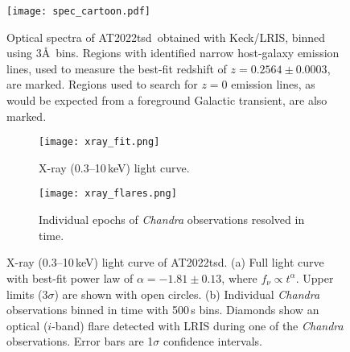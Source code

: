 \documentclass{nature_plusfigure}
\newcommand{\at}{AT2022tsd}
\begin{document}
\begin{extended_data}

\renewcommand{\thefigure}{\arabic{figure}~Extended~Data}
\renewcommand{\thefigure}{Extended Data Figure \arabic{figure}}
\renewcommand{\figurename}{}
\setcounter{figure}{0}

\renewcommand{\thetable}{\arabic{table}~Extended~Data}
\renewcommand{\thetable}{Extended Data Table \arabic{table}}
\renewcommand{\tablename}{}
\setcounter{table}{0}

\begin{figure}[ht]
 \centering
\texttt{[image: spec\_cartoon.pdf]}
  \caption{Optical spectra of \at\ obtained with Keck/LRIS, binned using 3\AA\ bins. Regions with identified narrow host-galaxy emission lines, used to measure the best-fit redshift of $z=0.2564\pm0.0003$, are marked. Regions used to search for $z=0$ emission lines, as would be expected from a foreground Galactic transient, are also marked.}
 \label{fig:spec}
\end{figure}

\begin{figure}[!ht]
 \centering
 \begin{subfigure}[t]{1.0\textwidth}
 	\centering
	\texttt{[image: xray\_fit.png]}
	\caption{X-ray (0.3--10\,keV) light curve.}
 \end{subfigure}
 \begin{subfigure}[t]{1.0\textwidth}
 	\centering
	\texttt{[image: xray\_flares.png]}
	\caption{Individual epochs of {\it Chandra} observations resolved in time.}
 \end{subfigure}
  \caption{X-ray (0.3--10\,keV) light curve of \at. (a) Full light curve with best-fit power law of $\alpha=-1.81\pm0.13$, where $f_\nu \propto t^{\alpha}$. Upper limits (3$\sigma$) are shown with open circles. (b) Individual {\it Chandra} observations binned in time with 500\,s bins. Diamonds show an optical ($i$-band) flare detected with LRIS during one of the {\it Chandra} observations. Error bars are 1$\sigma$ confidence intervals.}
 \label{fig:xray-lc}
\end{figure}


\end{extended_data}
\end{document}
